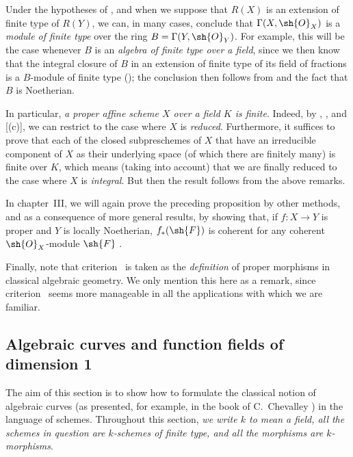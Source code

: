 \begin{remarks}[7.3.12]
\label{II.7.3.12}
Under the hypotheses of , and when we suppose that $R(X)$ is an extension of finite type of $R(Y)$, we can, in many cases, conclude that $\Gamma(X,\sh{O}_X)$ is a \emph{module of finite type} over the ring $B=\Gamma(Y,\sh{O}_Y)$.
For example, this will be the case whenever $B$ is an \emph{algebra of finite type over a field}, since we then know that the integral closure of $B$ in an extension of finite type of its field of fractions is a $B$-module of finite type (\cite[t.~I, p.~267, th.~9]{I-13});
the conclusion then follows from  and the fact that $B$ is Noetherian.

In particular, \emph{a proper affine scheme $X$ over a field $K$ is finite}.
Indeed, by , , and [(c)], we can restrict to the case where $X$ is \emph{reduced}.
Furthermore, it suffices to prove that each of the closed subpreschemes of $X$ that have an irreducible component of $X$ as their underlying space (of which there are finitely many) is finite over $K$, which means (taking  into account) that we are finally reduced to the case where $X$ is \emph{integral}.
But then the result follows from the above remarks.

In chapter~III, we will again prove the preceding proposition by other methods, and as a consequence of more general results, by showing that, if $f:X\to Y$ is proper and $Y$ is locally Noetherian, $f_*(\sh{F})$ is coherent for any coherent $\sh{O}_X$-module $\sh{F}$ .

Finally, note that criterion~ is taken as the \emph{definition} of proper morphisms in classical algebraic geometry.
We only mention this here as a remark, since criterion~ seems more manageable in all the applications with which we are familiar.
\end{remarks}



\subsection{Algebraic curves and function fields of dimension 1}
\label{subsection:II.7.4}

The aim of this section is to show how to formulate the classical notion of algebraic curves (as presented, for example, in the book of C.~Chevalley \cite{II-23}) in the language of schemes.
Throughout this section, \emph{we write $k$ to mean a field, all the schemes in question are $k$-schemes of finite type, and all the morphisms are $k$-morphisms}.

